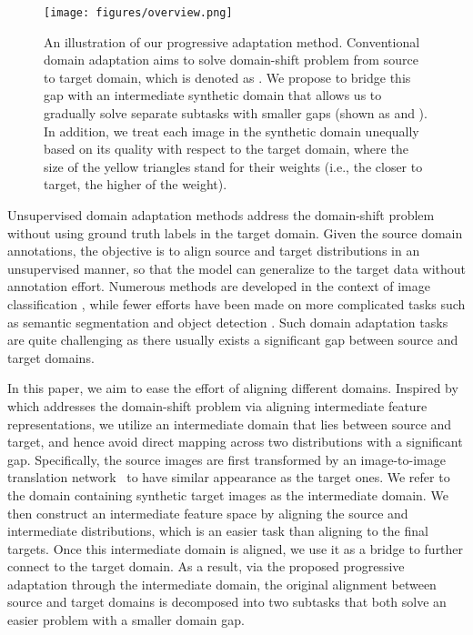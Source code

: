 \documentclass[10pt,twocolumn,letterpaper]{article}
\begin{document}
\begin{figure}[!htb]
		\begin{center}
        \texttt{[image: figures/overview.png]}
		\end{center}
		\caption{
        An illustration of our progressive adaptation method.
Conventional domain adaptation aims to solve domain-shift problem from source to target domain, which is denoted as .
We propose to bridge this gap with an intermediate synthetic domain that allows us to gradually solve separate subtasks with smaller gaps (shown as  and ).
In addition, we treat each image in the synthetic domain unequally based on its quality with respect to the target domain, where the size of the yellow triangles stand for their weights (i.e., the closer to target, the higher of the weight).
		}
		\label{fig:overview}
\vspace{-2mm}
\end{figure}

Unsupervised domain adaptation methods address the domain-shift problem without using ground truth labels in the target domain.
Given the source domain annotations, the objective is to align source and target distributions in an unsupervised manner, so that the model can generalize to the target data without annotation effort.
Numerous methods are developed in the context of image classification \cite{Tzeng2014DeepDC, pmlr-v37-long15, Long2017DeepTL, sun2016deep, gopalan2011domain, Tzeng2017AdversarialDD, ganin2016domain, Bousmalis2016DomainSN}, while fewer efforts have been made on more complicated tasks such as semantic segmentation \cite{Hoffman2016FCNsIT, Tsai_adaptseg_2018} and object detection \cite{hoffman2014lsda, chen2018domain, Inoue_2018_CVPR}.
Such domain adaptation tasks are quite challenging as there usually exists a significant gap between source and target domains.


In this paper, we aim to ease the effort of aligning different domains.
Inspired by \cite{gopalan2011domain} which addresses the domain-shift problem via aligning intermediate feature representations, we utilize an intermediate domain that lies between source and target, and hence avoid direct mapping across two distributions with a significant gap.
Specifically, the source images are first transformed by an image-to-image translation network~\cite{CycleGAN2017} to have similar appearance as the target ones. We refer to the domain containing synthetic target images as the intermediate domain.
We then construct an intermediate feature space by aligning the source and intermediate distributions, which is an easier task than aligning to the final targets.
Once this intermediate domain is aligned, we use it as a bridge to further connect to the target domain.
As a result, via the proposed progressive adaptation through the intermediate domain, the original alignment between source and target domains is decomposed into two subtasks that both solve an easier problem with a smaller domain gap.
\end{document}
